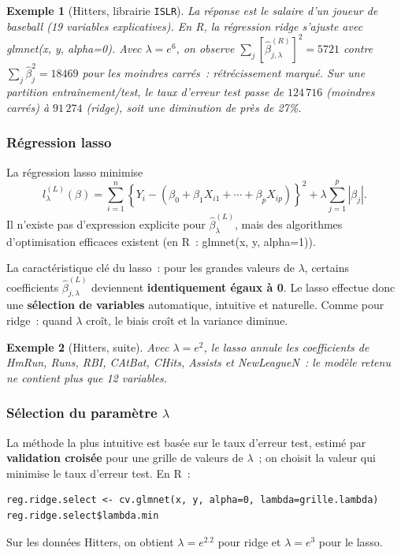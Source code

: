 \documentclass[11pt,letterpaper]{article}
\newtheorem{exemple}{Exemple}[section]
\begin{document}
\begin{exemple}[\textsf{Hitters}, librairie \texttt{ISLR}]
La réponse est le salaire d'un joueur de baseball (19 variables explicatives). En \textrm{R}, la régression ridge s'ajuste avec \textsf{glmnet(x, y, alpha=0)}. Avec $\lambda = e^6$, on observe $\sum_j[\hat\beta^{(R)}_{j,\lambda}]^2 = 5721$ contre $\sum_j\hat\beta_j^2 = 18469$ pour les moindres carrés~: rétrécissement marqué. Sur une partition entraînement/test, le taux d'erreur test passe de $124\,716$ (moindres carrés) à $91\,274$ (ridge), soit une diminution de près de 27\%.
\end{exemple}

\subsubsection{Régression lasso}

La régression lasso minimise
$$l^{(L)}_\lambda(\beta) = \sum_{i=1}^n\left\{Y_i - (\beta_0 + \beta_1 X_{i1} + \cdots + \beta_p X_{ip})\right\}^2 + \lambda\sum_{j=1}^p|\beta_j|.$$
Il n'existe pas d'expression explicite pour $\hat\beta^{(L)}_\lambda$, mais des algorithmes d'optimisation efficaces existent (en \textrm{R}~: \textsf{glmnet(x, y, alpha=1)}).

La caractéristique clé du lasso~: pour les grandes valeurs de $\lambda$, certains coefficients $\hat\beta^{(L)}_{j,\lambda}$ deviennent \textbf{identiquement égaux à 0}. Le lasso effectue donc une \textbf{sélection de variables} automatique, intuitive et naturelle. Comme pour ridge~: quand $\lambda$ croît, le biais croît et la variance diminue.

\begin{exemple}[\textsf{Hitters}, suite]
Avec $\lambda = e^2$, le lasso annule les coefficients de \textsf{HmRun}, \textsf{Runs}, \textsf{RBI}, \textsf{CAtBat}, \textsf{CHits}, \textsf{Assists} et \textsf{NewLeagueN}~: le modèle retenu ne contient plus que 12 variables.
\end{exemple}

\subsubsection{Sélection du paramètre $\lambda$}

La méthode la plus intuitive est basée sur le taux d'erreur test, estimé par \textbf{validation croisée} pour une grille de valeurs de $\lambda$~; on choisit la valeur qui minimise le taux d'erreur test. En \textrm{R}~:
\begin{verbatim}
reg.ridge.select <- cv.glmnet(x, y, alpha=0, lambda=grille.lambda)
reg.ridge.select$lambda.min
\end{verbatim}
Sur les données \textsf{Hitters}, on obtient $\lambda = e^{2.2}$ pour ridge et $\lambda = e^3$ pour le lasso.
\end{document}
